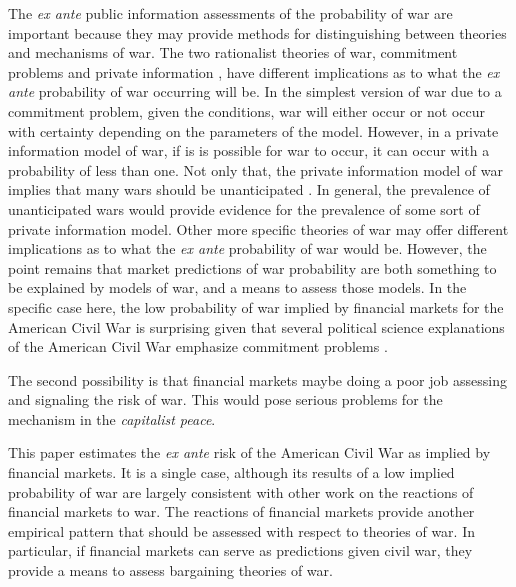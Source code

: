 The \textit{ex ante} public information assessments of the probability of war are important because they may provide methods for distinguishing between theories and mechanisms of war.
The two rationalist theories of war, commitment problems and private information \parencites{Fearon1995,Powell2006}, have different implications as to what the \textit{ex ante} probability of war occurring will be.
In the simplest version of war due to a commitment problem, given the conditions, war will either occur or not occur with certainty depending on the parameters of the model.
However, in a private information model of war, if is is possible for war to occur, it can occur with a probability of less than one.
Not only that, the private information model of war implies that many wars should be unanticipated \parencite{Gartzke1999}.
In general, the prevalence of unanticipated wars would provide evidence for the prevalence of some sort of private information model.
Other more specific theories of war may offer different implications as to what the \textit{ex ante} probability of war would be.
However, the point remains that market predictions of war probability are both something to be explained by models of war, and a means to assess those models.
In the specific case here, the low probability of war implied by financial markets for the American Civil War is surprising given that several political science  explanations of the American Civil War emphasize commitment problems \parencites{Reiter2009}{Weingast1998}.

The second possibility is that financial markets maybe doing a poor job assessing and signaling the risk of war.
This would pose serious problems for the mechanism in the \textit{capitalist peace}.

This paper estimates the \textit{ex ante} risk of the American Civil War as implied by financial markets.
It is a single case, although its results of a low implied probability of war are largely consistent with other work on the reactions of financial markets to war.
The reactions of financial markets provide another empirical pattern that should be assessed with respect to theories of war.
In particular, if financial markets can serve as predictions given civil war, they provide a means to assess bargaining theories of war.


